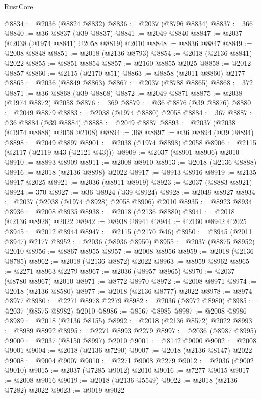 \begin{lexlean}{RustCore}
\begin{coremodule}
@8834 := @2036 (@8824 @8832)
@8836 := @2037 (@8796 @8834)
@8837 := 366
@8840 := @36 @8837 (@39 @8837)
@8841 := @2049 @8840
@8847 := @2037 (@2038 (@1974 @8841) @2058 @8819) @2010
@8848 := @8836 @8847
@8849 := @2008 @8848
@8851 := @2018 (@2136 @8793)
@8854 := @2018 (@2136 @8841) @2022
@8855 := @8851 @8854
@8857 := @2160 @8855 @2025
@8858 := @2012 @8857
@8860 := @2115 (@2170 @51)
@8863 := @8858 (@2011 @8860) @2177
@8865 := @2036 (@8849 @8863)
@8867 := @2037 (@8788 @8865)
@8868 := 372
@8871 := @36 @8868 (@39 @8868)
@8872 := @2049 @8871
@8875 := @2038 (@1974 @8872) @2058
@8876 := 369
@8879 := @36 @8876 (@39 @8876)
@8880 := @2049 @8879
@8883 := @2038 (@1974 @8880) @2058
@8884 := 367
@8887 := @36 @8884 (@39 @8884)
@8888 := @2049 @8887
@8893 := @2037 (@2038 (@1974 @8888) @2058 @2108)
@8894 := 368
@8897 := @36 @8894 (@39 @8894)
@8898 := @2049 @8897
@8901 := @2038 (@1974 @8898) @2058
@8906 := @2115 (@2117 (@2119 @43 (@2121 @43)))
@8909 := @2037 (@8901 @8906) @2010
@8910 := @8893 @8909
@8911 := @2008 @8910
@8913 := @2018 (@2136 @8888)
@8916 := @2018 (@2136 @8898) @2022
@8917 := @8913 @8916
@8919 := @2135 @8917 @2025
@8921 := @2036 (@8911 @8919)
@8923 := @2037 (@8883 @8921)
@8924 := 370
@8927 := @36 @8924 (@39 @8924)
@8928 := @2049 @8927
@8934 := @2037 (@2038 (@1974 @8928) @2058 @8906) @2010
@8935 := @8923 @8934
@8936 := @2008 @8935
@8938 := @2018 (@2136 @8880)
@8941 := @2018 (@2136 @8928) @2022
@8942 := @8938 @8941
@8944 := @2160 @8942 @2025
@8945 := @2012 @8944
@8947 := @2115 (@2170 @46)
@8950 := @8945 (@2011 @8947) @2177
@8952 := @2036 (@8936 @8950)
@8955 := @2037 (@8875 @8952) @2010
@8956 := @8867 @8955
@8957 := @2008 @8956
@8959 := @2018 (@2136 @8785)
@8962 := @2018 (@2136 @8872) @2022
@8963 := @8959 @8962
@8965 := @2271 @8963 @2279
@8967 := @2036 (@8957 @8965)
@8970 := @2037 (@8780 @8967) @2010
@8971 := @8772 @8970
@8972 := @2008 @8971
@8974 := @2018 (@2136 @8580)
@8977 := @2018 (@2136 @8777) @2022
@8978 := @8974 @8977
@8980 := @2271 @8978 @2279
@8982 := @2036 (@8972 @8980)
@8985 := @2037 (@8575 @8982) @2010
@8986 := @8567 @8985
@8987 := @2008 @8986
@8989 := @2018 (@2136 @8155)
@8992 := @2018 (@2136 @8572) @2022
@8993 := @8989 @8992
@8995 := @2271 @8993 @2279
@8997 := @2036 (@8987 @8995)
@9000 := @2037 (@8150 @8997) @2010
@9001 := @8142 @9000
@9002 := @2008 @9001
@9004 := @2018 (@2136 @7290)
@9007 := @2018 (@2136 @8147) @2022
@9008 := @9004 @9007
@9010 := @2271 @9008 @2279
@9012 := @2036 (@9002 @9010)
@9015 := @2037 (@7285 @9012) @2010
@9016 := @7277 @9015
@9017 := @2008 @9016
@9019 := @2018 (@2136 @5549)
@9022 := @2018 (@2136 @7282) @2022
@9023 := @9019 @9022

\end{coremodule}
\end{lexlean}
